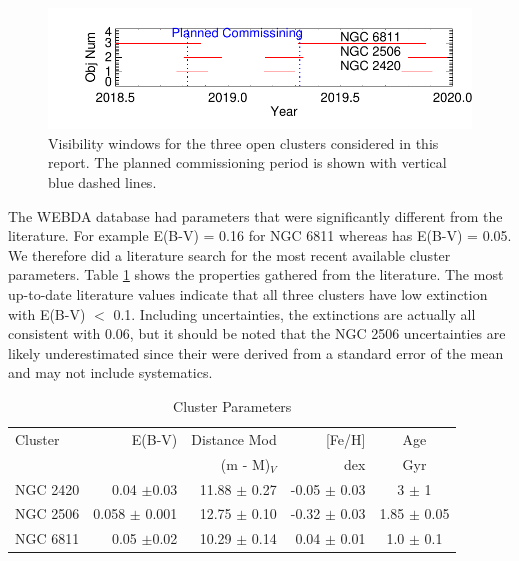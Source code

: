 \documentclass{aastex6}
\newcommand{\DHSresApprox}{300}
\begin{document}
\begin{figure}
\centering
\includegraphics[width=.4\columnwidth]{cluster_visibilty.pdf}
\caption{Visibility windows for the three open clusters considered in this report.
The planned commissioning period is shown with vertical blue dashed lines.}\label{fig:clusterVis}
\end{figure}


The WEBDA database had parameters that were significantly different from the literature.
For example E(B-V) = 0.16 for NGC 6811 whereas \citet{molendaz2016spec6811} has E(B-V) = 0.05.
We therefore did a literature search for the most recent available cluster parameters.
Table \ref{tab:clusterProp} shows the properties gathered from the literature.
The most up-to-date literature values indicate that all three clusters have low extinction with E(B-V) $<$ 0.1.
Including uncertainties, the extinctions are actually all consistent with 0.06, but it should be noted that the NGC 2506 uncertainties are likely underestimated since their were derived from a standard error of the mean and may not include systematics.

\begin{table}
\centering
\caption{Cluster Parameters}\label{tab:clusterProp}
\begin{tabular}{lrrrc}
\hline \hline
Cluster   					&  E(B-V) 			& Distance Mod 	& [Fe/H] 			& Age \\
          					&     				&    (m - M)$_V$	& 	dex 			& Gyr \\
\hline \hline
NGC 2420\tablenotemark{a}	& 0.04 $\pm$0.03	&  11.88 $\pm$ 0.27	& -0.05 $\pm$ 0.03	& 3 $\pm$ 1 \\
NGC 2506\tablenotemark{b}	& 0.058 $\pm$ 0.001	&  12.75 $\pm$ 0.10 	& -0.32 $\pm$ 0.03	& 1.85 $\pm$ 0.05 \\
NGC 6811\tablenotemark{c}	& 0.05 $\pm$0.02	& 10.29 $\pm$ 0.14	& 0.04 $\pm$ 0.01 	& 1.0 $\pm$ 0.1 \\
\hline
\end{tabular}
\end{table}
\end{document}
